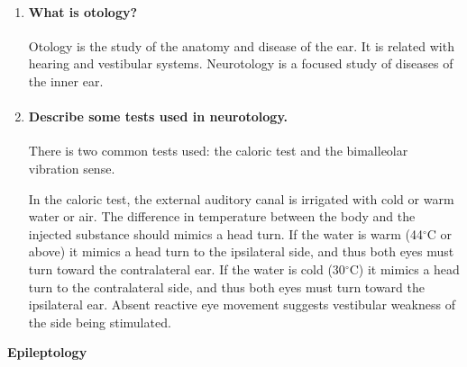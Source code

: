 \documentclass[12pt,article,oneside,a4paper]{memoir}
\begin{document}
\begin{enumerate}

\item \paragraph{What is otology?}
Otology is the study of the anatomy and disease of the ear. It is related with
hearing and vestibular systems. Neurotology is a focused study of diseases of
the inner ear.

\item \paragraph{Describe some tests used in neurotology.}
There is two common tests used: the caloric test and the bimalleolar vibration sense.

In the caloric test, the external auditory canal is irrigated with cold or warm
water or air. The difference in temperature between the body and the injected
substance should mimics a head turn. If the water is warm (44$^{\circ}$C or
above) it mimics a head turn to the ipsilateral side, and thus both eyes must
turn toward the contralateral ear. If the water is cold (30$^{\circ}$C) it
mimics a head turn to the contralateral side, and thus both eyes must turn
toward the ipsilateral ear. Absent reactive eye movement suggests vestibular
weakness of the side being stimulated.

\end{enumerate}
\textbf{Epileptology}\\
\end{document}
